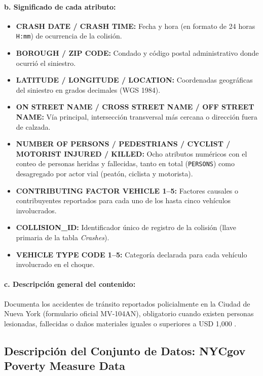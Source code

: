 \documentclass[11pt,a4paper]{article}
\begin{document}
\paragraph{b. Significado de cada atributo:}
\begin{itemize}
    \item \textbf{CRASH DATE / CRASH TIME:} Fecha y hora (en formato de 24 horas \texttt{H:mm}) de ocurrencia de la colisión.
    \item \textbf{BOROUGH / ZIP CODE:} Condado y código postal administrativo donde ocurrió el siniestro.
    \item \textbf{LATITUDE / LONGITUDE / LOCATION:} Coordenadas geográficas del siniestro en grados decimales (WGS 1984).
    \item \textbf{ON STREET NAME / CROSS STREET NAME / OFF STREET NAME:} Vía principal, intersección transversal más cercana o dirección fuera de calzada.
    \item \textbf{NUMBER OF PERSONS / PEDESTRIANS / CYCLIST / MOTORIST INJURED / KILLED:} Ocho atributos numéricos con el conteo de personas heridas y fallecidas, tanto en total (\texttt{PERSONS}) como desagregado por actor vial (peatón, ciclista y motorista).
    \item \textbf{CONTRIBUTING FACTOR VEHICLE 1--5:} Factores causales o contribuyentes reportados para cada uno de los hasta cinco vehículos involucrados.
    \item \textbf{COLLISION\_ID:} Identificador único de registro de la colisión (llave primaria de la tabla \textit{Crashes}).
    \item \textbf{VEHICLE TYPE CODE 1--5:} Categoría declarada para cada vehículo involucrado en el choque.
\end{itemize}

\paragraph{c. Descripción general del contenido:} Documenta los accidentes de tránsito reportados policialmente en la Ciudad de Nueva York (formulario oficial MV-104AN), obligatorio cuando existen personas lesionadas, fallecidas o daños materiales iguales o superiores a USD 1,000 \cite{nyc_collisions_crashes_2026}.

\subsection{Descripción del Conjunto de Datos: NYCgov Poverty Measure Data}
\label{subsec:desc_poverty}
\end{document}
